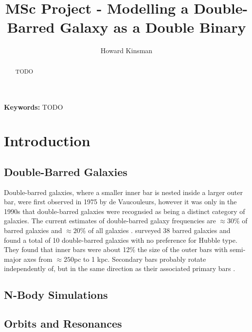 \documentclass[a4paper,12pt]{article}
\author{Howard Kinsman}
\title{MSc Project - Modelling a Double-Barred Galaxy as a Double Binary}
\begin{document}
\maketitle
\begin{abstract}
TODO
\end{abstract}
{\bf Keywords:} TODO
\section{Introduction}
\subsection{Double-Barred Galaxies}
Double-barred galaxies, where a smaller inner bar is nested inside a larger outer bar, were first observed in 1975 by de Vaucouleurs, however it was only in the 1990s that double-barred galaxies
were recognsied as being a distinct category of galaxies. The current estimates of double-barred galaxy frequencies are $\approx30\%$ of barred galaxies and $\approx20\%$ of all galaxies \citep{erwin3}.
\cite{erwin2} surveyed 38 barred galaxies and found a total of 10 double-barred galaxies with no preference for Hubble type. They found that inner bars were about 12\% the size of the outer bars with
semi-major axes from $\approx250$pc to 1 kpc. Secondary bars probably rotate independently of, but in the same direction as their associated primary bars \cite{erwin2}.

\subsection{N-Body Simulations}


\subsection{Orbits and Resonances}
\end{document}
